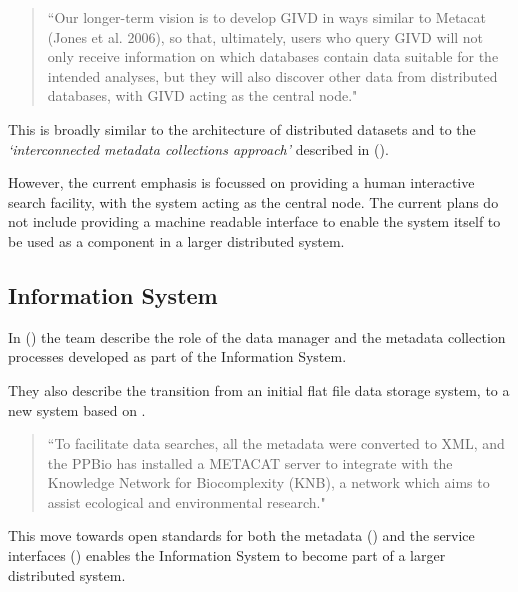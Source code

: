 \documentclass{article}
\begin{document}
\begin{quote}
``Our longer-term vision is to develop GIVD in ways similar to Metacat
(Jones et al. 2006), so that, ultimately, users who query GIVD will not
only receive information on which databases contain data suitable for the
intended analyses, but they will also discover other data from distributed
databases, with GIVD acting as the central node."
\end{quote}

This is broadly similar to the \cite{vo} architecture of distributed datasets
and to the \textit{`interconnected metadata collections approach'} described
in  (\cite{jones-2006}).

However, the current emphasis is focussed on providing a human interactive
search facility, with the \cite{givd} system acting as the central node.
The current plans do not include providing a machine readable interface
to enable the \cite{givd} system itself to be used as a component in a
larger distributed system.

\subsection{\cite{ppbio} Information System}

In  (\cite{pezzini-2012}) the \cite{ppbio} team
describe the role of the data manager and the metadata collection processes
developed as part of the \cite{ppbio} Information System.

They also describe the transition from an initial flat file data storage
system, to a new system based on \cite{metacat}.

\begin{quote}
``To facilitate data searches, all the metadata were converted to XML, and
the PPBio has installed a METACAT server to integrate with the Knowledge
Network for Biocomplexity (KNB), a network which aims to assist ecological
and environmental research."
\end{quote}

This move towards open standards for both the metadata (\cite{eml}) and the
service interfaces (\cite{metacat}) enables the \cite{ppbio} Information
System to become part of a larger distributed system.

\subsection{}
\end{document}

